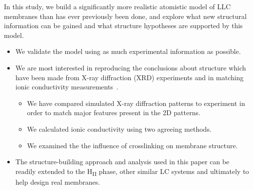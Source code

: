 \documentclass{article}
\begin{document}
 
  
  In this study, we build a significantly more realistic atomistic model of LLC membranes
  than has ever previously been done, and explore what new structural information can be gained
  and what structure hypotheses are supported by this model.

  \begin{itemize}
    \item We validate the model using as much experimental information as possible.
    \item We are most interested in reproducing the conclusions about structure
    which have been made from X-ray diffraction (XRD) experiments and in matching ionic
    conductivity measurements~\cite{feng_thin_2016}.
    \begin{itemize}
	    \item We have compared simulated X-ray diffraction patterns to experiment in 
	    order to match major features present in the 2D patterns.
	    \item We calculated ionic conductivity using two agreeing methods.
	    \item We examined the the influence of crosslinking on membrane structure.
    \end{itemize}
    \item The structure-building approach and analysis used in this paper can be readily extended
    to the H\textsubscript{II} phase, other similar LC systems and ultimately to help design
    real membranes.
  \end{itemize}
  
\end{document}
